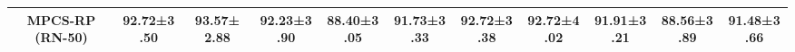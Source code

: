 \documentclass[conference]{IEEEtran}
\begin{document}
\begin{table*}[ht]
\begin{adjustbox}{max width=\textwidth}
\begin{tabular}{c|cccc|c|cccc|c}
MPCS-RP (RN-50)                                             & \multicolumn{1}{c|}{92.72±3.50}          & \multicolumn{1}{c|}{{\color[HTML]{1E1E1E} \textbf{93.57± 2.88}}} & \multicolumn{1}{c|}{{\color[HTML]{1E1E1E} 92.23±3.90}}          & {\color[HTML]{1E1E1E} 88.40±3.05}          & 91.73±3.33             & \multicolumn{1}{c|}{92.72±3.38}          & \multicolumn{1}{c|}{92.72±4.02}          & \multicolumn{1}{c|}{91.91±3.21}          & 88.56±3.89          & 91.48±3.66                                            \\ \hline
\end{tabular}
\end{adjustbox}
\end{table*}
 \begin{table}[t]
\caption{Performance comparison of proposed method MPCS (ResNet-50 encoder) on BACH dataset with other state-of-the-arts for four class classification. RN-50 indicates ResNet-50.}
\end{table}
\end{document}
